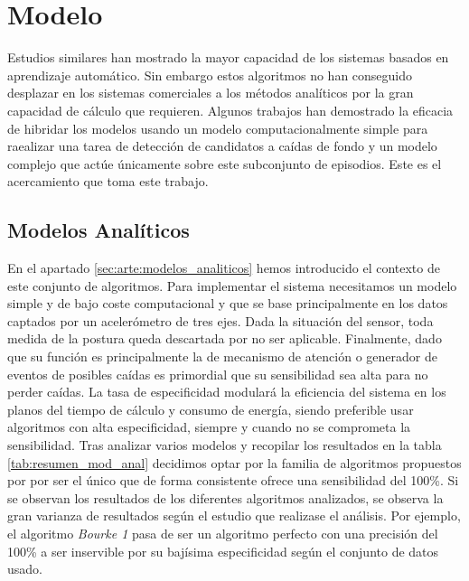 \section{Modelo}\label{req_modelos}

Estudios similares han mostrado la mayor capacidad de los sistemas basados en aprendizaje automático. Sin embargo estos algoritmos no han conseguido desplazar en los sistemas comerciales a los métodos analíticos por la gran capacidad de cálculo que requieren. Algunos trabajos han demostrado la eficacia de hibridar los modelos usando un modelo computacionalmente simple para raealizar una tarea de detección de candidatos a caídas de fondo y un modelo complejo que actúe únicamente sobre este subconjunto de episodios. Este es el acercamiento que toma este trabajo.

\subsection{Modelos Analíticos}

En el apartado \ref{sec:arte:modelos_analiticos} hemos introducido el contexto de este conjunto de algoritmos. Para implementar el sistema necesitamos un modelo simple y de bajo coste computacional y que se base principalmente en los datos captados por un acelerómetro de tres ejes. Dada la situación del sensor, toda medida de la postura queda descartada por no ser aplicable. Finalmente, dado que su función es principalmente la de mecanismo de atención o generador de eventos de posibles caídas es primordial que su sensibilidad sea alta para no perder caídas. La tasa de especificidad modulará la eficiencia del sistema en los planos del tiempo de cálculo y consumo de energía, siendo preferible usar algoritmos con alta especificidad, siempre y cuando no se comprometa la sensibilidad. Tras analizar varios modelos y recopilar los resultados en la tabla \ref{tab:resumen_mod_anal} decidimos optar por la familia de algoritmos propuestos por \cite{Bourke2006} por ser el único que de forma consistente ofrece una sensibilidad del 100\%. Si se observan los resultados de los diferentes algoritmos analizados, se observa la gran varianza de resultados según el estudio que realizase el análisis. Por ejemplo, el algoritmo \textit{Bourke 1} pasa de ser un algoritmo perfecto con una precisión del 100\% a ser inservible por su bajísima especificidad según el conjunto de datos usado. 

